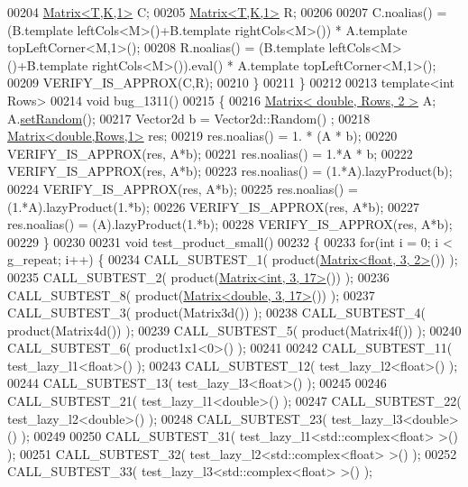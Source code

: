 \begin{DoxyCode}
00204     \hyperlink{group___core___module_class_eigen_1_1_matrix}{Matrix<T,K,1>} C;
00205     \hyperlink{group___core___module_class_eigen_1_1_matrix}{Matrix<T,K,1>} R;
00206 
00207     C.noalias() = (B.template leftCols<M>()+B.template rightCols<M>())        * A.template 
      topLeftCorner<M,1>();
00208     R.noalias() = (B.template leftCols<M>()+B.template rightCols<M>()).eval() * A.template 
      topLeftCorner<M,1>();
00209     VERIFY\_IS\_APPROX(C,R);
00210   \}
00211 \}
00212 
00213 \textcolor{keyword}{template}<\textcolor{keywordtype}{int} Rows>
00214 \textcolor{keywordtype}{void} bug\_1311()
00215 \{
00216   \hyperlink{group___core___module_class_eigen_1_1_matrix}{Matrix< double, Rows, 2 >} A;  A.\hyperlink{class_eigen_1_1_plain_object_base_af0e576a0e1aefc9ee346de44cc352ba3}{setRandom}();
00217   Vector2d b = Vector2d::Random() ;
00218   \hyperlink{group___core___module_class_eigen_1_1_matrix}{Matrix<double,Rows,1>} res;
00219   res.noalias() = 1. * (A * b);
00220   VERIFY\_IS\_APPROX(res, A*b);
00221   res.noalias() = 1.*A * b;
00222   VERIFY\_IS\_APPROX(res, A*b);
00223   res.noalias() = (1.*A).lazyProduct(b);
00224   VERIFY\_IS\_APPROX(res, A*b);
00225   res.noalias() = (1.*A).lazyProduct(1.*b);
00226   VERIFY\_IS\_APPROX(res, A*b);
00227   res.noalias() = (A).lazyProduct(1.*b);
00228   VERIFY\_IS\_APPROX(res, A*b);
00229 \}
00230 
00231 \textcolor{keywordtype}{void} test\_product\_small()
00232 \{
00233   \textcolor{keywordflow}{for}(\textcolor{keywordtype}{int} i = 0; i < g\_repeat; i++) \{
00234     CALL\_SUBTEST\_1( product(\hyperlink{group___core___module_class_eigen_1_1_matrix}{Matrix<float, 3, 2>}()) );
00235     CALL\_SUBTEST\_2( product(\hyperlink{group___core___module_class_eigen_1_1_matrix}{Matrix<int, 3, 17>}()) );
00236     CALL\_SUBTEST\_8( product(\hyperlink{group___core___module_class_eigen_1_1_matrix}{Matrix<double, 3, 17>}()) );
00237     CALL\_SUBTEST\_3( product(Matrix3d()) );
00238     CALL\_SUBTEST\_4( product(Matrix4d()) );
00239     CALL\_SUBTEST\_5( product(Matrix4f()) );
00240     CALL\_SUBTEST\_6( product1x1<0>() );
00241 
00242     CALL\_SUBTEST\_11( test\_lazy\_l1<float>() );
00243     CALL\_SUBTEST\_12( test\_lazy\_l2<float>() );
00244     CALL\_SUBTEST\_13( test\_lazy\_l3<float>() );
00245 
00246     CALL\_SUBTEST\_21( test\_lazy\_l1<double>() );
00247     CALL\_SUBTEST\_22( test\_lazy\_l2<double>() );
00248     CALL\_SUBTEST\_23( test\_lazy\_l3<double>() );
00249 
00250     CALL\_SUBTEST\_31( test\_lazy\_l1<std::complex<float> >() );
00251     CALL\_SUBTEST\_32( test\_lazy\_l2<std::complex<float> >() );
00252     CALL\_SUBTEST\_33( test\_lazy\_l3<std::complex<float> >() );

\end{DoxyCode}
